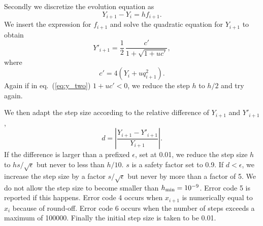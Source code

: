 Secondly we discretize the evolution equation as
\begin{equation}
  Y_{i+1} - Y_{i} = h f_{i+1} .
\end{equation}
We insert the expression for $f_{i+1}$ 
and solve the quadratic equation for $Y_{i+1}$ to obtain
\begin{equation}
  \label{eq:y_two}
  Y'_{i+1} = \frac{1}{2} \, \frac{c'}{1+\sqrt{1+uc'}} ,
\end{equation}
where
\begin{equation}
  c' = 4 \left( Y_{i} + u q^2_{i+1} \right) .
\end{equation}
Again if in eq.~(\ref{eq:y_two}) $1+uc'<0$, we reduce the step $h$ to $h/2$ and
try again.

We then adapt the step size according to the relative difference of $Y_{i+1} $
and $Y'_{i+1}$,
\begin{equation}
d = \left| \frac{ Y_{i+1} - Y'_{i+1} }{ Y_{i+1} } \right| .
\end{equation}
If the difference is larger than a prefixed $\epsilon$, set at 0.01, we reduce
the step size $h$ to $hs/\sqrt{\epsilon}$ but never to less than $h/10$.  $s$
is a safety factor set to 0.9. If $d<\epsilon$, we increase the step size by a
factor $s/\sqrt{\epsilon}$ but never by more than a factor of 5.  We do not
allow the step size to become smaller than $h_{\rm min} = 10^{-9}$. Error code
5 is reported if this happens.  Error code 4 occurs when $x_{i+1}$ is
numerically equal to $x_{i}$ because of round-off. Error code 6 occurs when the
number of steps exceeds a maximum of 100000.  Finally the initial step size is
taken to be 0.01.

